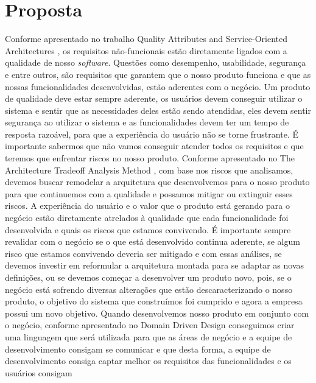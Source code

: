\chapter{Proposta}
  Conforme apresentado no trabalho Quality Attributes and Service-Oriented Architectures
  \cite{O'BrienQualityAttributes2005}, os requisitos não-funcionais estão diretamente
  ligados com a qualidade de nosso \textit{software}. Questões como desempenho,
  usabilidade, segurança e entre outros, são requisitos que garantem que o nosso
  produto funciona e que as nossas funcionalidades desenvolvidas, estão aderentes
  com o negócio. \newline
  Um produto de qualidade deve estar sempre aderente, os usuários devem conseguir
  utilizar o sistema e sentir que as necessidades deles estão sendo atendidas,
  eles devem sentir segurança ao utilizar o sistema e as funcionalidades devem
  ter um tempo de resposta razoável, para que a experiência do usuário não se
  torne frustrante. É importante sabermos que não vamos conseguir atender todos
  os requisitos e que teremos que enfrentar riscos no nosso produto. Conforme
  apresentado no The Architecture Tradeoff Analysis Method \cite{KazmanTheArchitecture1998},
  com base nos riscos que analisamos, devemos buscar remodelar a arquitetura que
  desenvolvemos para o nosso produto para que continuemos com a qualidade e possamos
  mitigar ou extinguir esses riscos. A experiência do usuário e o valor que o
  produto está gerando para o negócio estão diretamente atrelados à qualidade
  que cada funcionalidade foi desenvolvida e quais os riscos que estamos convivendo.
  É importante sempre revalidar com o negócio se o que está desenvolvido continua
  aderente, se algum risco que estamos convivendo deveria ser mitigado e com essas
  análises, se devemos investir em reformular a arquitetura montada para se
  adaptar as novas definições, ou se devemos começar a desenvolver um produto
  novo, pois, se o negócio está sofrendo diversas alterações que estão descaracterizando
  o nosso produto, o objetivo do sistema que construímos foi cumprido e agora
  a empresa possui um novo objetivo. \newline
  Quando desenvolvemos nosso produto em conjunto com o negócio, conforme apresentado
  no Domain Driven Design \cite{DomainDrivenDesign} conseguimos criar uma linguagem
  que será utilizada para que as áreas de negócio e a equipe de desenvolvimento
  consigam se comunicar e que desta forma, a equipe de desenvolvimento consiga
  captar melhor os requisitos das funcionalidades e os usuários consigam

